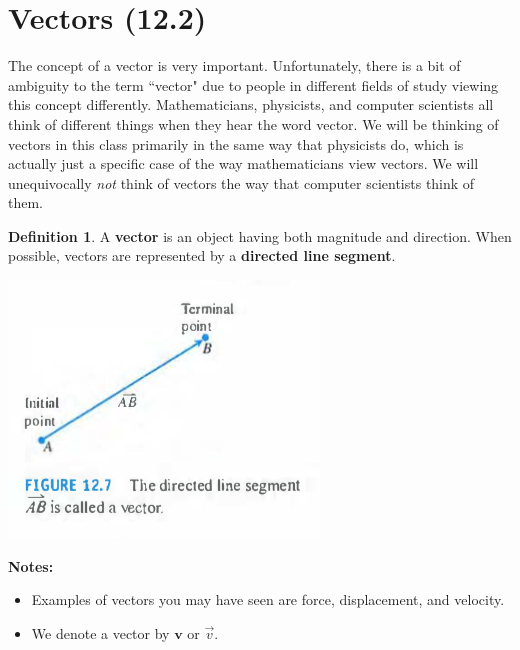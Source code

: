 \documentclass[12pt, letter]{article}
\theoremstyle{plain}
\numberwithin{theorem}{section}
\theoremstyle{definition}
\newtheorem{definition}[theorem]{Definition}
\begin{document}
\newpage


\section{Vectors (12.2)}

The concept of a vector is very important. Unfortunately, there is a bit of ambiguity to the term ``vector" due to people in different fields of study viewing this concept differently. Mathematicians, physicists, and computer scientists all think of different things when they hear the word vector. We will be thinking of vectors in this class primarily in the same way that physicists do, which is actually just a specific case of the way mathematicians view vectors. We will unequivocally \textit{not} think of vectors the way that computer scientists think of them.

\bigskip

\hrulefill

\bigskip

\begin{definition}
A \textbf{vector} is an object having both magnitude and direction. When possible, vectors are represented by a \textbf{directed line segment}.
\end{definition}

\bigskip

\begin{center}
\includegraphics[scale=0.7]{m1_f2}
\end{center}

\bigskip

\textbf{Notes:}
\begin{itemize}
\item Examples of vectors you may have seen are force, displacement, and velocity.
\item We denote a vector by $\bm{v}$ or $\vec{v}$.
\end{itemize}
\end{document}

